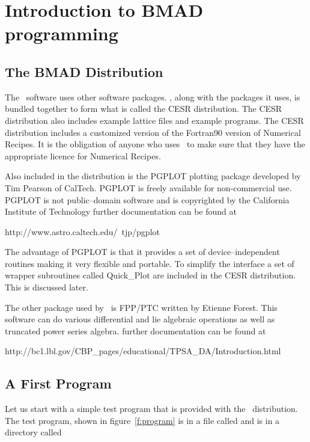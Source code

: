 \chapter{Introduction to BMAD programming}

\section{The BMAD Distribution}

The \bmad\ software uses other software packages. \bmad, along with
the packages it uses, is bundled together to form what is called the
CESR distribution. The CESR distribution also includes example
lattice files and example programs. The CESR distribution includes a
customized version of the Fortran90 version of Numerical
Recipes\cite{b:nr}. It is the obligation of anyone who uses \bmad\ to
make sure that they have the appropriate licence for Numerical
Recipes.

Also included in the distribution is the PGPLOT plotting package
developed by Tim Pearson of CalTech.  PGPLOT is freely available for
non-commercial use. PGPLOT is not public--domain software and is
copyrighted by the California Institute of Technology further
documentation can be found at
\begin{example}
    http://www.astro.caltech.edu/~tjp/pgplot
\end{example}
The advantage of PGPLOT is that it provides a set of
device--independent routines making it very flexible and portable. To
simplify the interface a set of wrapper subroutines called Quick\_Plot
are included in the CESR distribution. This is discussed later.

The other package used by \bmad\ is FPP/PTC written by Etienne
Forest. This software can do various differential and lie algebraic
operations as well as truncated power series algebra. further
documentation can be found at
\begin{example}
    http://bc1.lbl.gov/CBP_pages/educational/TPSA_DA/Introduction.html
\end{example}

\section{A First Program}

Let us start with a simple test program that is provided with the
\bmad\ distribution. The test program, shown in figure~\ref{f:program}
is in a file called
 and is in a directory called 

